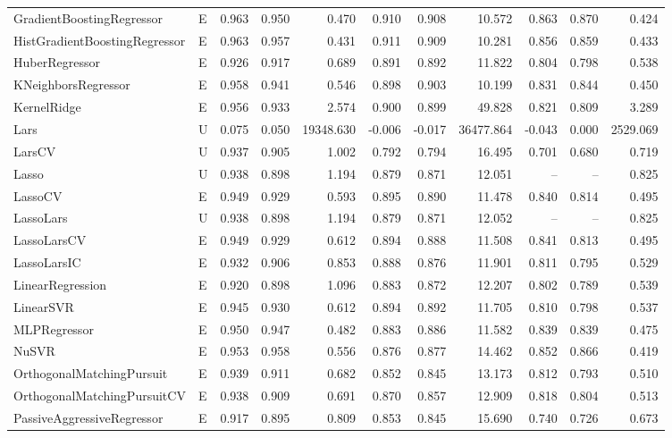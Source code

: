\documentclass[final,3p,times,twocolumn]{elsarticle}
\begin{document}
\begin{table}[t!]
\begin{adjustbox}{max width=\textwidth}
\begin{tabular}{llrrrrrrrrr}
        GradientBoostingRegressor & E & 0.963 & 0.950 & 0.470 & 0.910 & 0.908 & 10.572 & 0.863 & 0.870 & 0.424 \\
        HistGradientBoostingRegressor & E & 0.963 & 0.957 & 0.431 & 0.911 & 0.909 & 10.281 & 0.856 & 0.859 & 0.433 \\
        HuberRegressor & E & 0.926 & 0.917 & 0.689 & 0.891 & 0.892 & 11.822 & 0.804 & 0.798 & 0.538 \\
        KNeighborsRegressor & E & 0.958 & 0.941 & 0.546 & 0.898 & 0.903 & 10.199 & 0.831 & 0.844 & 0.450 \\
        KernelRidge & E & 0.956 & 0.933 & 2.574 & 0.900 & 0.899 & 49.828 & 0.821 & 0.809 & 3.289 \\
        Lars & U & 0.075 & 0.050 & 19348.630 & -0.006 & -0.017 & 36477.864 & -0.043 & 0.000 & 2529.069 \\
        LarsCV & U & 0.937 & 0.905 & 1.002 & 0.792 & 0.794 & 16.495 & 0.701 & 0.680 & 0.719 \\
        Lasso & U & 0.938 & 0.898 & 1.194 & 0.879 & 0.871 & 12.051 & -- & -- & 0.825 \\
        LassoCV & E & 0.949 & 0.929 & 0.593 & 0.895 & 0.890 & 11.478 & 0.840 & 0.814 & 0.495 \\
        LassoLars & U & 0.938 & 0.898 & 1.194 & 0.879 & 0.871 & 12.052 & -- & -- & 0.825 \\
        LassoLarsCV & E & 0.949 & 0.929 & 0.612 & 0.894 & 0.888 & 11.508 & 0.841 & 0.813 & 0.495 \\
        LassoLarsIC & E & 0.932 & 0.906 & 0.853 & 0.888 & 0.876 & 11.901 & 0.811 & 0.795 & 0.529 \\
        LinearRegression & E & 0.920 & 0.898 & 1.096 & 0.883 & 0.872 & 12.207 & 0.802 & 0.789 & 0.539 \\
        LinearSVR & E & 0.945 & 0.930 & 0.612 & 0.894 & 0.892 & 11.705 & 0.810 & 0.798 & 0.537 \\
        MLPRegressor & E & 0.950 & 0.947 & 0.482 & 0.883 & 0.886 & 11.582 & 0.839 & 0.839 & 0.475 \\
        NuSVR & E & 0.953 & 0.958 & 0.556 & 0.876 & 0.877 & 14.462 & 0.852 & 0.866 & 0.419 \\
        OrthogonalMatchingPursuit & E & 0.939 & 0.911 & 0.682 & 0.852 & 0.845 & 13.173 & 0.812 & 0.793 & 0.510 \\
        OrthogonalMatchingPursuitCV & E & 0.938 & 0.909 & 0.691 & 0.870 & 0.857 & 12.909 & 0.818 & 0.804 & 0.513 \\
        PassiveAggressiveRegressor & E & 0.917 & 0.895 & 0.809 & 0.853 & 0.845 & 15.690 & 0.740 & 0.726 & 0.673 \\

\end{tabular}
\end{adjustbox}
\end{table}
\end{document}
